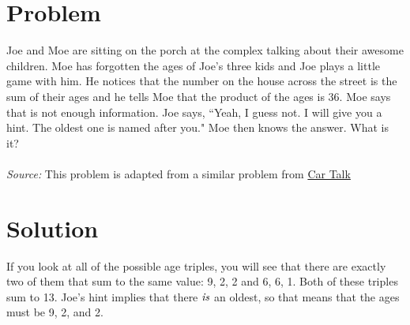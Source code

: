 \documentclass[11pt,a4paper]{report}
\theoremstyle{plain}
\theoremstyle{definition}
\theoremstyle{remark}
\begin{document}
\section*{Problem}
Joe and Moe are sitting on the porch at the complex talking about their awesome children.  Moe has forgotten the ages of Joe's three kids and Joe plays a little game with him.  He notices that the number on the house across the street is the sum of their ages and he tells Moe that the product of the ages is 36.  Moe says that is not enough information.  Joe says, ``Yeah, I guess not.  I will give you a hint.  The oldest one is named after you."  Moe then knows the answer.  What is it?
\\
\\
\textit{Source:} This problem is adapted from a similar problem from \href{https://www.cartalk.com}{Car Talk}

\newpage
\section*{Solution}
 If you look at all of the possible age triples, you will see that there are exactly two of them that sum to the same value:  9, 2, 2 and 6, 6, 1.  Both of these triples sum to 13.  Joe's hint implies that there $\emph{is}$ an oldest, so that means that the ages must be 9, 2, and 2.
\end{document}
